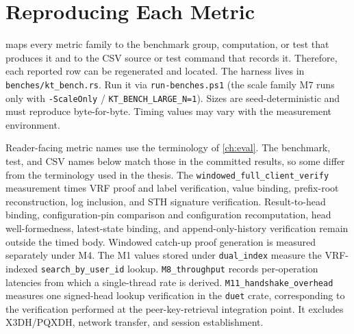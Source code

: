 \FloatBarrier
\section{Reproducing Each Metric}\label{sec:bench-repro}

 maps every metric family to the benchmark group, computation, or test that
produces it and to the CSV source or test command that records it. Therefore, each reported row can
be regenerated and located. The
harness lives in \texttt{benches/kt\_bench.rs}. Run it via \texttt{run-benches.ps1} (the scale family
M7 runs only with \texttt{-ScaleOnly} / \texttt{KT\_BENCH\_LARGE\_N=1}). Sizes are seed-deterministic
and must reproduce byte-for-byte. Timing values may vary with the
measurement environment.

\medskip\noindent Reader-facing metric names use the terminology of \cref{ch:eval}. The benchmark, test, and CSV
names below match those in the committed results, so some differ from the terminology used in the
thesis.
The \texttt{windowed\_full\_client\_verify} measurement times VRF proof and label verification,
value binding, prefix-root reconstruction, log inclusion, and STH signature verification. Result-to-head binding, configuration-pin
comparison and configuration recomputation, head well-formedness, latest-state binding, and append-only-history verification
remain outside the timed body. Windowed catch-up proof generation is measured separately under M4. The M1 values stored under \texttt{dual\_index} measure the VRF-indexed \texttt{search\_by\_user\_id} lookup. \texttt{M8\_throughput} records per-operation latencies from which a
single-thread rate is derived. \texttt{M11\_handshake\_overhead} measures one signed-head lookup
verification in the \texttt{duet} crate, corresponding to the verification performed at the
peer-key-retrieval integration point. It excludes X3DH/PQXDH, network transfer, and session establishment.

